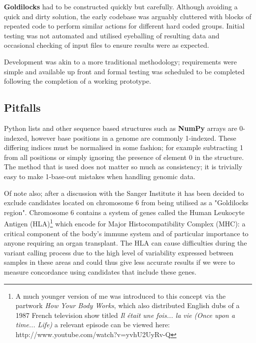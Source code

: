 \textbf{Goldilocks} had to be constructed quickly but carefully. Although
avoiding a quick and dirty solution, the early codebase was arguably cluttered
with blocks of repeated code to perform similar actions for different hard coded
groups. Initial testing was not automated and utilised eyeballing of resulting
data and occasional checking of input files to ensure results were as expected.

Development was akin to a more traditional methodology; requirements were simple
and available up front and formal testing was scheduled to be completed
following the completion of a working prototype.


\subsection{Pitfalls}

Python lists and other sequence based structures such as \textbf{NumPy} arrays
are 0-indexed, however base positions in a genome are commonly 1-indexed. These
differing indices must be normalised in some fashion; for example subtracting 1
from all positions or simply ignoring the presence of element 0 in
the structure. The method that is used does not matter so much as consistency;
it is trivially easy to make 1-base-out mistakes when handling genomic data.

Of note also; after a discussion with the Sanger Institute it has been decided
to exclude candidates located on chromosome 6 from being utilised as a
"Goldilocks region". Chromosome 6 contains a system of genes called the
Human Leukocyte Antigen (HLA)\footnote{A much younger version of me was introduced to
    this concept via the partwork \textit{How Your Body Works}\citep{bodyworks},
    which also distributed English dubs of a 1987 French television show titled
    \textit{Il était une fois... la vie (Once upon a time...
Life)\citep{oncelife}} a relevant episode can be viewed here:
http://www.youtube.com/watch?v=yvhU2UyRv-Q} which encode for Major
Histocompatibility Complex (MHC)\citep{hla-c6}: a critical component of the
body's immune system and of particular importance to anyone requiring an organ
transplant. The HLA can cause difficulties during the variant calling process
due to the high level of variability expressed between samples in these areas
and could thus give less accurate results if we were to measure concordance
using candidates that include these genes.



